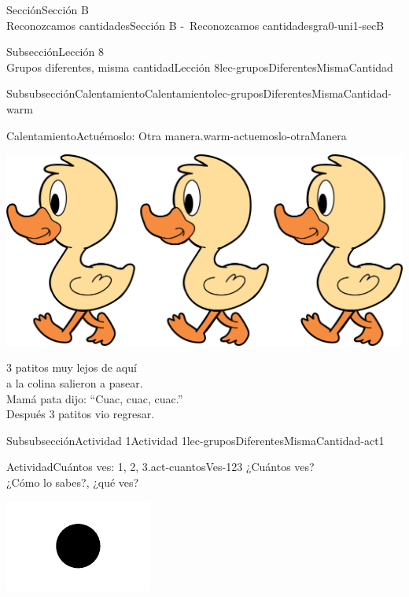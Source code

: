 \begin{sectionptx}{Sección}{{\Large Sección B\\}Reconozcamos cantidades}{}{Sección B -~Reconozcamos cantidades}{}{}{gra0-uni1-secB}
\begin{subsectionptx}{Subsección}{{\normalsize Lección 8\\[-0.05cm]}Grupos diferentes, misma cantidad}{}{Lección 8}{}{}{lec-gruposDiferentesMismaCantidad}
\begin{subsubsectionptx}{Subsubsección}{Calentamiento}{}{Calentamiento}{}{}{lec-gruposDiferentesMismaCantidad-warm}
\begin{exploration}{Calentamiento}{Actuémoslo: Otra manera.}{warm-actuemoslo-otraManera}
\begin{image}{0.0}{1}{0.0}{}
\includegraphics[max width=\linewidth, center]{external/png-source/3 ducks.png}
\end{image}%
%
\par
3 patitos muy lejos de aquí\\
 a la colina salieron a pasear.\\
 Mamá pata dijo: “Cuac, cuac, cuac.”\\
 Después 3 patitos vio regresar.%
\end{exploration}%
\end{subsubsectionptx}
%
%
\typeout{************************************************}
\typeout{************************************************}
%
\clearpage
\begin{subsubsectionptx}{Subsubsección}{Actividad 1}{}{Actividad 1}{}{}{lec-gruposDiferentesMismaCantidad-act1}
\begin{activity}{Actividad}{Cuántos ves: 1, 2, 3.}{act-cuantosVes-123}%
¿Cuántos ves?\\
 ¿Cómo lo sabes?, ¿qué ves?%
\begin{sidebyside}{3}{0.0416666666666667}{0.0416666666666667}{0.0833333333333333}%
\begin{sbspanel}{0.25}%
\includegraphics[max width=\linewidth, center]{external/svg-source/tikz-file-136322.pdf}

\end{sbspanel}
\end{sidebyside}
\end{activity}
\end{subsubsectionptx}
\end{subsectionptx}
\end{sectionptx}
